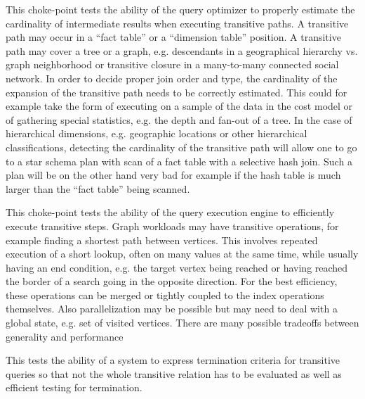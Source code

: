 
This choke-point tests the ability of the query optimizer to properly estimate the cardinality of intermediate results when executing transitive paths. A transitive path may occur in a ``fact table'' or a ``dimension table'' position.
A transitive path may cover a tree or a graph, e.g. descendants in a geographical hierarchy vs. graph neighborhood or transitive closure in a many-to-many connected social network.
In order to decide proper join order and type, the cardinality of the expansion of the transitive path needs to be correctly estimated.
This could for example take the form of executing on a sample of the data in the cost model or of gathering special statistics, e.g. the depth and fan-out of a tree. In the case of hierarchical dimensions,
e.g. geographic locations or other hierarchical classifications, detecting the cardinality of the transitive path will allow one to go to a star schema plan with scan of a fact table with a selective hash join.
Such a plan will be on the other hand very bad for example if the hash table is much larger than the ``fact table'' being scanned.




This choke-point tests the ability of the query execution engine to efficiently execute transitive steps. Graph workloads may have transitive operations, for example finding a shortest path between vertices.
This involves repeated execution of a short lookup, often on many values at the same time, while usually having an end condition, e.g. the target vertex being reached or having reached the border of a search going in the opposite direction.
For the best efficiency, these operations can be merged or tightly coupled to the index operations themselves. Also parallelization may be possible but may need to deal with a global state, e.g. set of visited vertices.
There are many possible tradeoffs between generality and performance




This tests the ability of a system to express termination criteria for transitive queries so that not the whole transitive relation has to be evaluated as well as efficient testing for termination.


